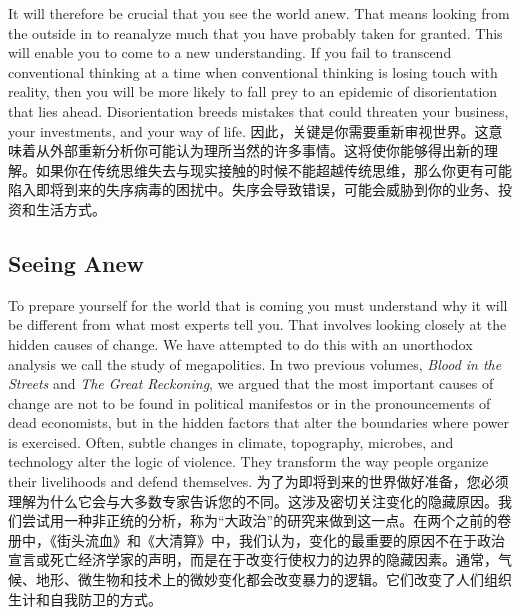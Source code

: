 \begin{Parallel}{97mm}{45mm}
  \ParallelLText
  {It will therefore be crucial that you see the world anew. That means looking from the outside in to reanalyze much that you have probably taken for granted. This will enable you to come to a new understanding. If you fail to transcend conventional thinking at a time when conventional thinking is losing touch with reality, then you will be more likely to fall prey to an epidemic of disorientation that lies ahead. Disorientation breeds mistakes that could threaten your business, your investments, and your way of life. }  
  \ParallelRText
  {\small 因此，关键是你需要重新审视世界。这意味着从外部重新分析你可能认为理所当然的许多事情。这将使你能够得出新的理解。如果你在传统思维失去与现实接触的时候不能超越传统思维，那么你更有可能陷入即将到来的失序病毒的困扰中。失序会导致错误，可能会威胁到你的业务、投资和生活方式。}
  \ParallelPar

\subsection{Seeing Anew}

  \ParallelLText
  {To prepare yourself for the world that is coming you must understand why it will be different from what most experts tell you. That involves looking closely at the hidden causes of change. We have attempted to do this with an unorthodox analysis we call the study of megapolitics. In two previous volumes, \emph{Blood in the Streets} and \emph{The Great Reckoning}, we argued that the most important causes of change are not to be found in political manifestos or in the pronouncements of dead economists, but in the hidden factors that alter the boundaries where power is exercised. Often, subtle changes in climate, topography, microbes, and technology alter the logic of violence. They transform the way people organize their livelihoods and defend themselves.   }  
  \ParallelRText
  {\small 为了为即将到来的世界做好准备，您必须理解为什么它会与大多数专家告诉您的不同。这涉及密切关注变化的隐藏原因。我们尝试用一种非正统的分析，称为“大政治”的研究来做到这一点。在两个之前的卷册中，《街头流血》和《大清算》中，我们认为，变化的最重要的原因不在于政治宣言或死亡经济学家的声明，而是在于改变行使权力的边界的隐藏因素。通常，气候、地形、微生物和技术上的微妙变化都会改变暴力的逻辑。它们改变了人们组织生计和自我防卫的方式。}
  \ParallelPar



\end{Parallel}
